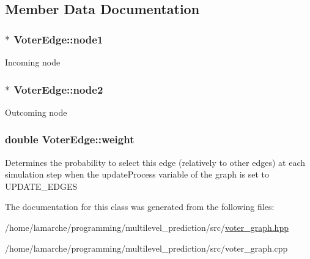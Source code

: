 \subsection{Member Data Documentation}
\hypertarget{class_voter_edge_aaa3e4febee48a905652ba142b8a48b7e}{
\subsubsection[{node1}]{$\ast$ Voter\-Edge\-::node1}}\label{class_voter_edge_aaa3e4febee48a905652ba142b8a48b7e}
Incoming node \hypertarget{class_voter_edge_a2483bd0524c590213c0abd33f7a5de2b}{
\subsubsection[{node2}]{$\ast$ Voter\-Edge\-::node2}}\label{class_voter_edge_a2483bd0524c590213c0abd33f7a5de2b}
Outcoming node \hypertarget{class_voter_edge_a08b1042475d9628a0da0e7ebf8557923}{
\subsubsection[{weight}]{\setlength{\rightskip}{0pt plus 5cm}double Voter\-Edge\-::weight}}\label{class_voter_edge_a08b1042475d9628a0da0e7ebf8557923}
Determines the probability to select this edge (relatively to other edges) at each simulation step when the update\-Process variable of the graph is set to U\-P\-D\-A\-T\-E\-\_\-\-E\-D\-G\-E\-S 

The documentation for this class was generated from the following files\-:\begin{DoxyCompactItemize}
\item 
/home/lamarche/programming/multilevel\-\_\-prediction/src/\hyperlink{voter__graph_8hpp}{voter\-\_\-graph.\-hpp}\item 
/home/lamarche/programming/multilevel\-\_\-prediction/src/voter\-\_\-graph.\-cpp\end{DoxyCompactItemize}

